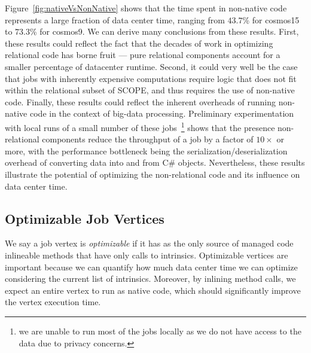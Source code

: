 
Figure~\ref{fig:nativeVsNonNative} shows that the time spent in non-native code represents a large fraction of data center time, ranging from $43.7$\% for cosmos15 to $73.3$\% for cosmos9. 
We can derive many conclusions from these results. First, these results could reflect the fact that the decades of work in optimizing relational code has borne fruit --- pure relational components account for a smaller percentage of datacenter runtime. Second, it could very well be the case that jobs with inherently expensive computations require logic that does not fit within the relational subset of SCOPE, and thus requires the use of non-native code. Finally,
these results could reflect the inherent overheads of running non-native code in the context of big-data processing. Preliminary experimentation with local runs of a small number of these jobs~\footnote{we are unable to run most of the jobs locally as we do not have access to the data due to privacy concerns.} shows that the presence non-relational components reduce the throughput of a job by a factor of $10\times$ or more, with the performance bottleneck being the serialization/deserialization overhead of converting data into and from C\# objects. Nevertheless, 
these results illustrate the potential of optimizing the non-relational code and its influence on data center time.



\subsection{Optimizable Job Vertices}


We say a job vertex is \emph{optimizable} if it has as the only source of managed code inlineable methods that have only calls to intrinsics. 
Optimizable vertices are important because we can quantify how much data center time we can optimize considering the current list of intrinsics. 
Moreover, by inlining method calls, we expect an entire vertex to run as native code, which should significantly improve the vertex execution time.

